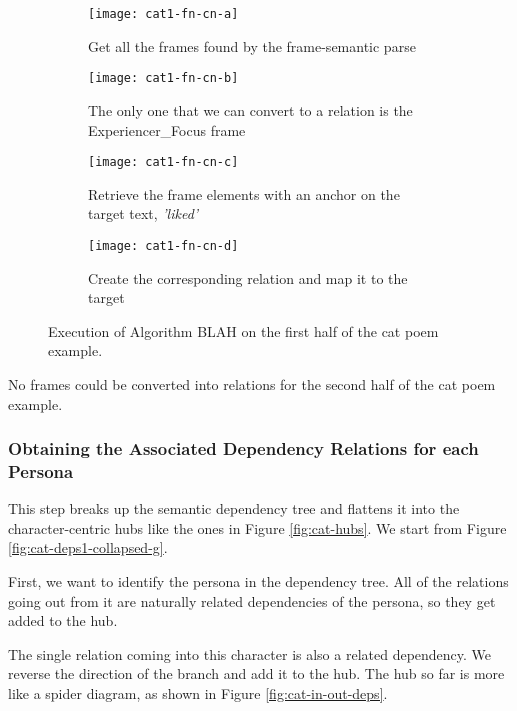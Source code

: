 \begin{figure}[H]
\centering
\begin{subfigure}[t]{0.9\textwidth}
	\centering
    \texttt{[image: cat1-fn-cn-a]}
    \caption{Get all the frames found by the frame-semantic parse}
\end{subfigure}
\begin{subfigure}[t]{0.9\textwidth}
	\centering
    \texttt{[image: cat1-fn-cn-b]}
    \caption{The only one that we can convert to a relation is the Experiencer\_Focus frame}
\end{subfigure}
\begin{subfigure}[t]{0.9\textwidth}
	\centering
    \texttt{[image: cat1-fn-cn-c]}
    \caption{Retrieve the frame elements with an anchor on the target text, \textit{'liked'}}
\end{subfigure}
\begin{subfigure}[t]{0.9\textwidth}
	\centering
    \texttt{[image: cat1-fn-cn-d]}
    \caption{Create the corresponding relation and map it to the target}
\end{subfigure}
\caption{Execution of Algorithm BLAH on the first half of the cat poem example.}
\label{fig:cat1-fn-cn}
\end{figure}

No frames could be converted into relations for the second half of the cat poem example.

\subsubsection{Obtaining the Associated Dependency Relations for each Persona}

This step breaks up the semantic dependency tree and flattens it into the character-centric hubs like the ones in Figure \ref{fig:cat-hubs}. We start from Figure \ref{fig:cat-deps1-collapsed-g}.

First, we want to identify the persona in the dependency tree. All of the relations going out from it are naturally related dependencies of the persona, so they get added to the hub.

The single relation coming into this character is also a related dependency. We reverse the direction of the branch and add it to the hub. The hub so far is more like a spider diagram, as shown in Figure \ref{fig:cat-in-out-deps}.

